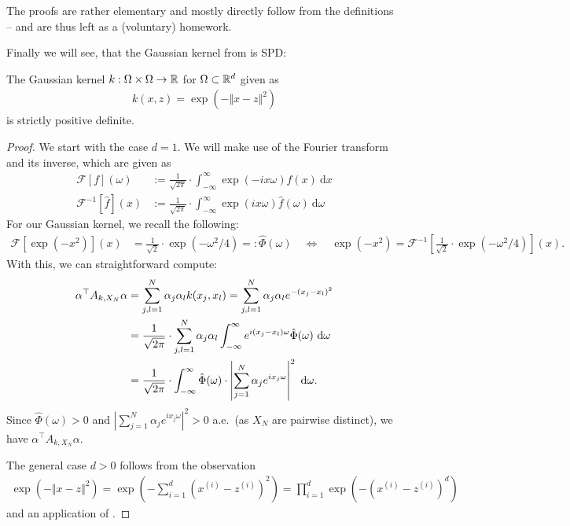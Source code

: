 The proofs are rather elementary and mostly directly follow from the definitions -- and are thus left as a (voluntary) homework.

Finally we will see, that the Gaussian kernel from  is SPD:

\begin{prop}
\label{prop:spd_gaussian}
The Gaussian kernel $k: \Omega \times \Omega \rightarrow \mathbb{R}$ for $\Omega \subset \mathbb{R}^d$ given as
\begin{align*}
k(x, z) = \exp(-\Vert x - z \Vert^2)
\end{align*}
is strictly positive definite.
\end{prop}

\begin{proof}
We start with the case $d=1$.
We will make use of the Fourier transform and its inverse, which are given as
\begin{align*}
\mathcal{F}[f](\omega) &:= \frac{1}{\sqrt{2\pi}} \cdot \int_{-\infty}^\infty \exp(-ix\omega) f(x) ~ \mathrm{d}x \\
\mathcal{F}^{-1}[\hat{f}](x) &:= \frac{1}{\sqrt{2\pi}} \cdot \int_{-\infty}^\infty \exp(ix\omega) \hat{f}(\omega) ~ \mathrm{d}\omega
\end{align*}
For our Gaussian kernel, we recall the following:
\begin{align*}
\mathcal{F} \left[\exp(-x^2) \right](x) &=  \frac{1}{\sqrt{2}} \cdot \exp(-\omega^2 / 4) =: \hat{\Phi}(\omega) \quad \Leftrightarrow \quad
\exp(-x^2) = \mathcal{F}^{-1} \left[\frac{1}{\sqrt{2}} \cdot \exp(-\omega^2 / 4) \right](x).
\end{align*}
With this, we can straightforward compute:
\begin{align}
\label{eq:spd_via_fourier}
\alpha^\top A_{k, X_N} \alpha &= \sum_{j, l=1}^N \alpha_j \alpha_l k(x_j, x_l) = \sum_{j, l=1}^N \alpha_j \alpha_l e^{-(x_j - x_l)^2} \notag \\
&= \frac{1}{\sqrt{2\pi}} \cdot \sum_{j, l=1}^N \alpha_j \alpha_l \int_{-\infty}^\infty e^{i(x_j - x_l)\omega} \hat{\Phi}(\omega) ~ \mathrm{d}\omega \notag \\
&= \frac{1}{\sqrt{2\pi}} \cdot \int_{-\infty}^\infty \hat{\Phi}(\omega) \cdot \left| \sum_{j=1}^N \alpha_j e^{ix_j \omega} \right|^2 ~ \mathrm{d}\omega.
\end{align}
Since $\hat{\Phi}(\omega) > 0$ and $\left| \sum_{j=1}^N \alpha_j e^{ix_j \omega} \right|^2 > 0$ a.e.\ (as $X_N$ are pairwise distinct),
we have $\alpha^\top A_{k, X_N} \alpha$.

The general case $d>0$ follows from the observation
\begin{align*}
\exp(-\Vert x - z \Vert^2) = \exp(-\sum_{i=1}^d (x^{(i)} - z^{(i)})^2) = \prod_{i=1}^d \exp(-(x^{(i)} - z^{(i)})^d)
\end{align*}
and an application of .

\end{proof}

